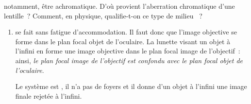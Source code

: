 \documentclass[a4paper, 10pt, garamond, oneside]{book}
\begin{document}
{\begin{enumerate}
		      notamment, être achromatique. D'où provient l'aberration chromatique
		      d'une lentille~? Comment, en physique, qualifie-t-on ce type de milieu
		      ~?
	\end{enumerate}
}{
	\begin{enumerate}
		\item {} se fait sans fatigue
		      d'accommodation. Il faut donc que l'image objective se forme dans le
		      plan focal objet de l'oculaire. La lunette visant un objet à l'infini
		      en forme une image objective dans le plan focal image de l'objectif~:
		      ainsi, \emph{le plan focal image de l'objectif est confondu avec le
			      plan focal objet de l'oculaire}.

		      Le système est , il n'a pas de foyers et il donne
		      d'un objet à l'infini une image finale rejetée à l'infini.


\end{enumerate}}
\end{document}
